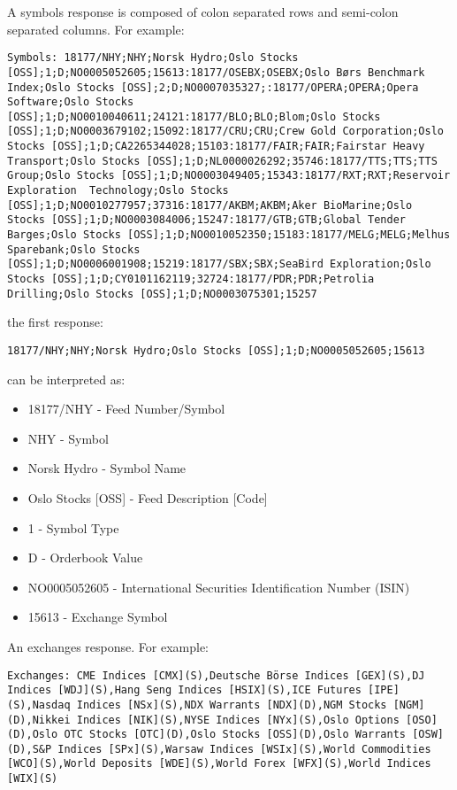 \documentclass[12pt,twoside,letterpaper]{report}
\begin{document}
A symbols response is composed of colon separated rows and semi-colon separated columns. For example:
\begin{lstlisting}
Symbols: 18177/NHY;NHY;Norsk Hydro;Oslo Stocks [OSS];1;D;NO0005052605;15613:18177/OSEBX;OSEBX;Oslo Børs Benchmark Index;Oslo Stocks [OSS];2;D;NO0007035327;:18177/OPERA;OPERA;Opera Software;Oslo Stocks [OSS];1;D;NO0010040611;24121:18177/BLO;BLO;Blom;Oslo Stocks [OSS];1;D;NO0003679102;15092:18177/CRU;CRU;Crew Gold Corporation;Oslo Stocks [OSS];1;D;CA2265344028;15103:18177/FAIR;FAIR;Fairstar Heavy Transport;Oslo Stocks [OSS];1;D;NL0000026292;35746:18177/TTS;TTS;TTS Group;Oslo Stocks [OSS];1;D;NO0003049405;15343:18177/RXT;RXT;Reservoir Exploration  Technology;Oslo Stocks [OSS];1;D;NO0010277957;37316:18177/AKBM;AKBM;Aker BioMarine;Oslo Stocks [OSS];1;D;NO0003084006;15247:18177/GTB;GTB;Global Tender Barges;Oslo Stocks [OSS];1;D;NO0010052350;15183:18177/MELG;MELG;Melhus Sparebank;Oslo Stocks [OSS];1;D;NO0006001908;15219:18177/SBX;SBX;SeaBird Exploration;Oslo Stocks [OSS];1;D;CY0101162119;32724:18177/PDR;PDR;Petrolia Drilling;Oslo Stocks [OSS];1;D;NO0003075301;15257
\end{lstlisting}
the first response:
\begin{verbatim}
18177/NHY;NHY;Norsk Hydro;Oslo Stocks [OSS];1;D;NO0005052605;15613
\end{verbatim}
can be interpreted as:
\begin{itemize}
\item 18177/NHY - Feed Number/Symbol
\item NHY - Symbol
\item Norsk Hydro - Symbol Name
\item Oslo Stocks [OSS] - Feed Description [Code]
\item 1 - Symbol Type
\item D - Orderbook Value
\item NO0005052605 - International Securities Identification Number (ISIN)
\item 15613 - Exchange Symbol
\end{itemize}

An exchanges response. For example:
\begin{lstlisting}
Exchanges: CME Indices [CMX](S),Deutsche Börse Indices [GEX](S),DJ Indices [WDJ](S),Hang Seng Indices [HSIX](S),ICE Futures [IPE](S),Nasdaq Indices [NSx](S),NDX Warrants [NDX](D),NGM Stocks [NGM](D),Nikkei Indices [NIK](S),NYSE Indices [NYx](S),Oslo Options [OSO](D),Oslo OTC Stocks [OTC](D),Oslo Stocks [OSS](D),Oslo Warrants [OSW](D),S&P Indices [SPx](S),Warsaw Indices [WSIx](S),World Commodities [WCO](S),World Deposits [WDE](S),World Forex [WFX](S),World Indices [WIX](S)
\end{lstlisting}
\end{document}
